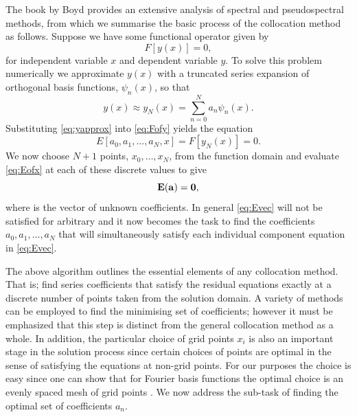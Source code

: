 The book by Boyd\cite{Boyd:CFSM} provides an extensive analysis of spectral and pseudospectral methods, from which we summarise the basic process of the collocation method as follows. Suppose we have some functional operator given by
\begin{equation}
F[y(x)]=0, \label{eq:Fofy}
\end{equation}
for independent variable $x$ and dependent variable $y$. To solve this problem numerically we approximate $y(x)$ with a truncated series expansion of orthogonal basis functions, $\psi_n(x)$, so that
\begin{equation}
y(x)\approx y_N(x)= \sum_{n=0}^N a_n \psi_n(x). \label{eq:yapprox}
\end{equation}
Substituting \eqref{eq:yapprox} into \eqref{eq:Fofy} yields the equation
\begin{equation}
E[a_0,a_1,\ldots,a_N,x]=F[y_N(x)]=0. \label{eq:Eofx}
\end{equation}
We now choose $N+1$ points, $x_0,\ldots,x_N$, from the function domain and evaluate \eqref{eq:Eofx} at each of these discrete values to give
\begin{equation}
\mathbf{E(\mathbf{a})}=\mathbf{0}, \label{eq:Evec}
\end{equation}
where  is the vector of unknown coefficients. In general \eqref{eq:Evec} will not be satisfied for arbitrary  and it now becomes the task to find the coefficients $a_0,a_1,\ldots,a_N$ that will simultaneously satisfy each individual component equation in \eqref{eq:Evec}.

The above algorithm outlines the essential elements of any collocation method. That is; find series coefficients that satisfy the residual equations exactly at a discrete number of points taken from the solution domain. A variety of methods can be employed to find the minimising set of coefficients; however it must be emphasized that this step is distinct from the general collocation method as a whole. In addition, the particular choice of grid points $x_i$ is also an important stage in the solution process since certain choices of points are optimal in the sense of satisfying the equations at non-grid points. For our purposes the choice is easy since one can show that for Fourier basis functions the optimal choice is an evenly spaced mesh of grid points \cite{Boyd:CFSM}. We now address the sub-task of finding the optimal set of coefficients $a_n$.

